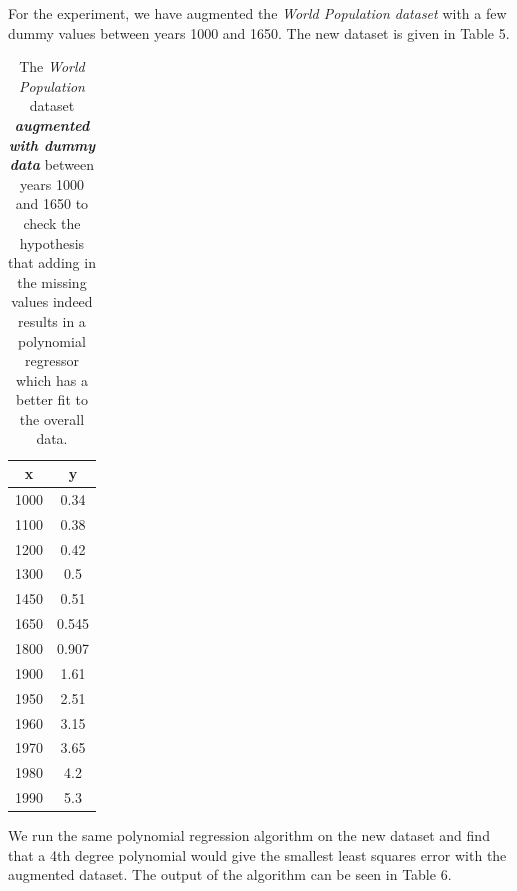 \documentclass[a4paper,11pt]{article}
\begin{document}
For the experiment, we have augmented the \textit{World Population dataset} with a few dummy values between years 1000 and 1650. The new dataset is given in Table 5. 



\begin{table}[ht]
\centering
\label{augmented-label}
\begin{tabular}{|c|c|}
\hline
 \textbf{x}&\textbf{y} \\ \hline
1000 & 0.34 \\
1100 & 0.38 \\
1200 & 0.42 \\
1300 & 0.5 \\
1450 & 0.51 \\
1650 & 0.545 \\
1800 & 0.907 \\
1900 & 1.61 \\
1950 & 2.51 \\
1960 & 3.15 \\
1970 & 3.65 \\
1980 & 4.2 \\
1990 & 5.3 \\
\hline
\end{tabular}
\caption{The \textit{World Population} dataset \textbf{\textit{augmented with dummy data}}  between years 1000 and 1650 to check the hypothesis that adding in the missing values indeed results in a polynomial regressor which has a better fit to the overall data.}
\end{table}
We run the same polynomial regression algorithm on the new dataset and find that a 4th degree polynomial would give the smallest least squares error with the augmented dataset. The output of the algorithm can be seen in Table 6.
\end{document}
